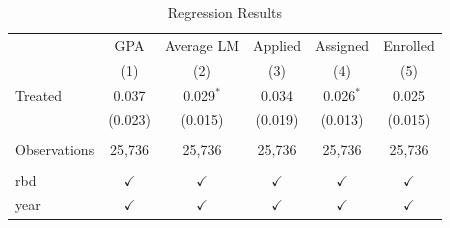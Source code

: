 \begin{table}[htbp]
   \caption{\label{tab:reg_results} Regression Results}
   \bigskip
   \centering
   \begin{tabular}{lccccc}
      \toprule
                   & GPA           & Average LM    & Applied       & Assigned      & Enrolled\\  
                   & (1)           & (2)           & (3)           & (4)           & (5)\\  
      \midrule 
      Treated      & 0.037         & 0.029$^{*}$   & 0.034         & 0.026$^{*}$   & 0.025\\   
                   & (0.023)       & (0.015)       & (0.019)       & (0.013)       & (0.015)\\   
       \\
      Observations & 25,736        & 25,736        & 25,736        & 25,736        & 25,736\\  
       \\
      rbd          & $\checkmark$  & $\checkmark$  & $\checkmark$  & $\checkmark$  & $\checkmark$\\   
      year         & $\checkmark$  & $\checkmark$  & $\checkmark$  & $\checkmark$  & $\checkmark$\\   
      \bottomrule
   \end{tabular}
\end{table}
